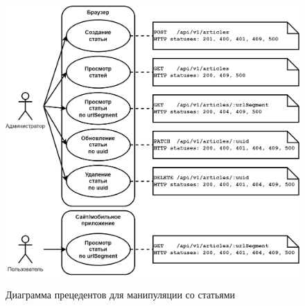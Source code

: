 \begin{figure}[!p]
    \centering

    \includegraphics[height=11cm]
    {images/UML/UML_precedent_articles.png}

    \caption{Диаграмма прецедентов для манипуляции со статьями}

    \label{fig:UML_precedent_articles}
\end{figure}












